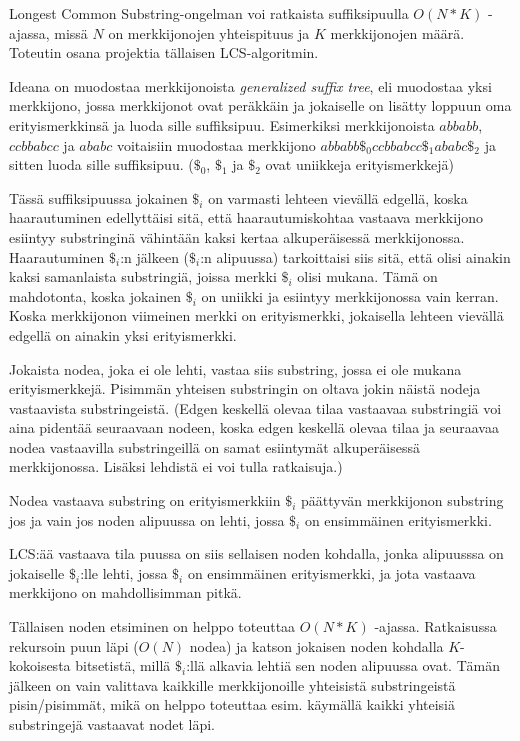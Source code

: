 \documentclass{article}
\begin{document}
    Longest Common Substring-ongelman voi ratkaista suffiksipuulla $O(N*K)$ -ajassa, missä $N$ on merkkijonojen yhteispituus ja
    $K$ merkkijonojen määrä. Toteutin osana projektia tällaisen LCS-algoritmin.
    
    Ideana on muodostaa merkkijonoista \textit{generalized suffix tree}, eli muodostaa yksi merkkijono, jossa merkkijonot ovat
    peräkkäin ja jokaiselle on lisätty loppuun oma erityismerkkinsä ja luoda sille suffiksipuu.
    Esimerkiksi merkkijonoista $abbabb$, $ccbbabcc$ ja $ababc$ voitaisiin muodostaa merkkijono $abbabb\$_0ccbbabcc\$_1ababc\$_2$
    ja sitten luoda sille suffiksipuu. ($\$_0$, $\$_1$ ja $\$_2$ ovat uniikkeja erityismerkkejä)
    
    Tässä suffiksipuussa jokainen $\$_i$ on varmasti lehteen vievällä edgellä, koska haarautuminen edellyttäisi sitä, että
    haarautumiskohtaa vastaava merkkijono esiintyy substringinä vähintään kaksi kertaa alkuperäisessä merkkijonossa. Haarautuminen
    $\$_i$:n jälkeen ($\$_i$:n alipuussa) tarkoittaisi siis sitä, että olisi ainakin kaksi samanlaista substringiä, joissa merkki 
    $\$_i$ olisi mukana. Tämä on mahdotonta, koska jokainen $\$_i$ on uniikki ja esiintyy merkkijonossa vain kerran. Koska 
    merkkijonon viimeinen merkki on erityismerkki, jokaisella lehteen vievällä edgellä on ainakin yksi erityismerkki.
    
    Jokaista nodea, joka ei ole lehti, vastaa siis substring, jossa ei ole mukana erityismerkkejä. Pisimmän yhteisen substringin
    on oltava jokin näistä nodeja vastaavista substringeistä. (Edgen keskellä olevaa tilaa vastaavaa substringiä voi aina pidentää 
    seuraavaan nodeen, koska edgen keskellä olevaa tilaa ja seuraavaa nodea vastaavilla substringeillä on samat esiintymät 
    alkuperäisessä merkkijonossa. Lisäksi lehdistä ei voi tulla ratkaisuja.)
    
    Nodea vastaava substring on erityismerkkiin $\$_i$ päättyvän merkkijonon substring jos ja vain jos noden alipuussa on lehti, jossa
    $\$_i$ on ensimmäinen erityismerkki.
    
    LCS:ää vastaava tila puussa on siis sellaisen noden kohdalla, jonka alipuusssa on jokaiselle $\$_i$:lle lehti, jossa $\$_i$ 
    on ensimmäinen erityismerkki, ja jota vastaava merkkijono on mahdollisimman pitkä.
    
    Tällaisen noden etsiminen on helppo toteuttaa $O(N*K)$ -ajassa. Ratkaisussa rekursoin puun läpi ($O(N)$ nodea) ja katson 
    jokaisen noden kohdalla $K$-kokoisesta bitsetistä, millä $\$_i$:llä alkavia lehtiä sen noden alipuussa ovat. Tämän jälkeen
    on vain valittava kaikkille merkkijonoille yhteisistä substringeistä pisin/pisimmät, mikä on helppo toteuttaa esim. käymällä
    kaikki yhteisiä substringejä vastaavat nodet läpi.
    
\end{document}
